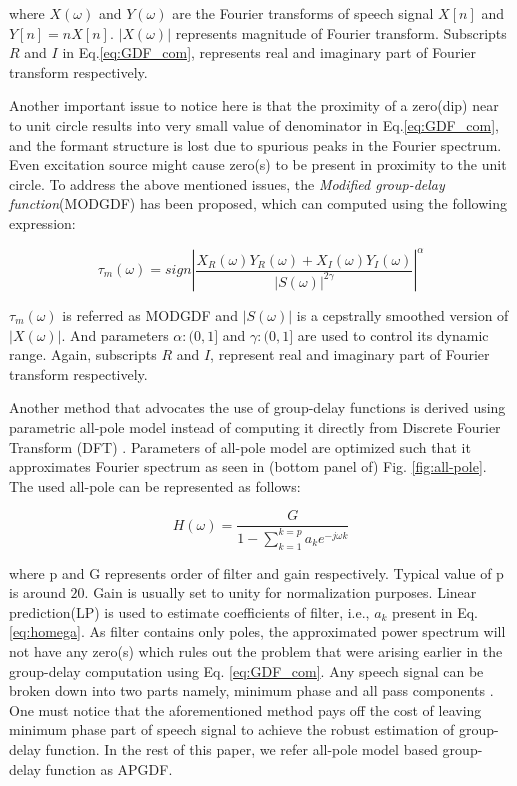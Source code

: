 \documentclass[conference]{IEEEtran}
\begin{document}
where $X(\omega)$ and $Y(\omega)$ are the Fourier transforms of speech signal $X[n]$ and $Y[n] = nX[n]$. $|X(\omega)|$ represents magnitude of Fourier transform. Subscripts $R$ and $I$ in Eq.\ref{eq:GDF_com}, represents real and imaginary part of Fourier transform respectively. 

Another important issue to notice here is that the proximity of a zero(dip) near to unit circle results into very small value of denominator in Eq.\ref{eq:GDF_com}, and the formant structure is lost due to spurious peaks in the Fourier spectrum. Even excitation source might cause zero(s) to be present in proximity to the unit circle. To address the above mentioned issues, the \textit{Modified group-delay function}(MODGDF) has been proposed, which can computed using the following expression:

\begin{equation}
\tau_{m}(\omega) =  sign | \frac{X_R(\omega)Y_R(\omega) + X_I(\omega)Y_I(\omega)}{|S(\omega)|^{2\gamma}} |^{\alpha} 
\label{eq:MODGDF}
\end{equation}

$\tau_{m}(\omega)$  is referred as MODGDF and $|S(\omega)|$ is a cepstrally smoothed version of $|X(\omega)|$. And parameters $\alpha:(0,1]$ and $\gamma:(0,1]$ are used to control its dynamic range. Again, subscripts $R$ and $I$, represent real and imaginary part of Fourier transform respectively. 

Another method that advocates the use of group-delay functions is derived using parametric all-pole model instead of computing it directly from Discrete Fourier Transform (DFT) \cite{allPoleGdSid}. Parameters of all-pole model are optimized such that it approximates Fourier spectrum as seen in (bottom panel of) Fig. \ref{fig:all-pole}. The used all-pole can be represented as follows: 

\begin{equation}
H(\omega) =  \frac{G}{1 - \sum_{k=1}^{k = p} a_k e^{-j\omega k} }
\label{eq:homega}
\end{equation}

where p and G represents order of filter and gain respectively. Typical value of p is around $20$. Gain is usually set to unity for normalization purposes. Linear prediction(LP) is used to estimate coefficients of filter, i.e., $a_k$ present in Eq. \ref{eq:homega}. As filter contains only poles, the approximated power spectrum will not have any zero(s) which rules out the problem that were arising earlier in the group-delay computation using Eq. \ref{eq:GDF_com}. Any speech signal can be broken down into two parts namely, minimum phase and all pass components \cite{allPoleGdSid}. One must notice that the aforementioned method pays off the cost of leaving minimum phase part of speech signal to achieve the robust estimation of group-delay function. In the rest of this paper, we refer all-pole model based group-delay function as APGDF.
\end{document}
